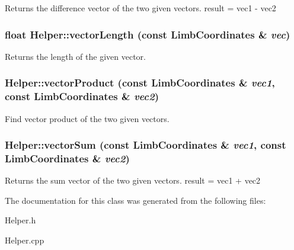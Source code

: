 \label{classHelper_abc864cbfae3b0021fec149776b4d2ce0}
Returns the difference vector of the two given vectors. result = vec1 -\/ vec2 \hypertarget{classHelper_a9d5e7130ec677185eed512648cea7753}{
\subsubsection[{vectorLength}]{\setlength{\rightskip}{0pt plus 5cm}float Helper::vectorLength (const {\bf LimbCoordinates} \& {\em vec})}}
\label{classHelper_a9d5e7130ec677185eed512648cea7753}
Returns the length of the given vector. \hypertarget{classHelper_a9a8b68baa1c84bf3886489e76c7d9951}{
\subsubsection[{vectorProduct}]{ Helper::vectorProduct (const {\bf LimbCoordinates} \& {\em vec1}, \/  const {\bf LimbCoordinates} \& {\em vec2})}}
\label{classHelper_a9a8b68baa1c84bf3886489e76c7d9951}
Find vector product of the two given vectors. \hypertarget{classHelper_af01207ddd47379314a7b9f88ff2b656d}{
\subsubsection[{vectorSum}]{ Helper::vectorSum (const {\bf LimbCoordinates} \& {\em vec1}, \/  const {\bf LimbCoordinates} \& {\em vec2})}}
\label{classHelper_af01207ddd47379314a7b9f88ff2b656d}
Returns the sum vector of the two given vectors. result = vec1 + vec2 

The documentation for this class was generated from the following files:\begin{DoxyCompactItemize}
\item 
Helper.h\item 
Helper.cpp\end{DoxyCompactItemize}
